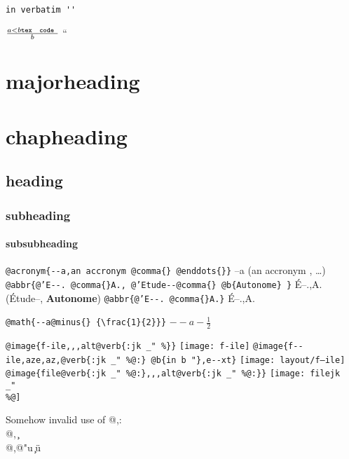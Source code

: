 \documentclass{book}
\newcommand{\GNUTexinfoplaceholder}[1]{}
\newcommand{\GNUTexinfonopagebreakheading}[2]{\let\clearpage\relax \let\cleardoublepage\relax \let\thispagestyle\GNUTexinfoplaceholder #1{#2}}
\renewcommand{\includegraphics}[1]{\fbox{FIG #1}}
\begin{document}
\begin{verbatim}
in verbatim ''
\end{verbatim}





$\frac{a < b \texttt{tex \hbox{ code }}}{b}$ ``

\GNUTexinfonopagebreakheading{\chapter*}{majorheading}

\GNUTexinfonopagebreakheading{\chapter*}{chapheading}

\GNUTexinfonopagebreakheading{\section*}{heading}

\GNUTexinfonopagebreakheading{\subsection*}{subheading}

\GNUTexinfonopagebreakheading{\subsubsection*}{subsubheading}


\texttt{@acronym\{{-}{-}a,an accronym @comma\{\} @enddots\{\}\}} --a (an accronym , \dots{})
\texttt{@abbr\{@'E{-}{-}. @comma\{\}A., @'Etude{-}{-}@comma\{\} @b\{Autonome\} \}} \'{E}--.\@ ,A.\@ (\'{E}tude--, \textbf{Autonome})
\texttt{@abbr\{@'E{-}{-}. @comma\{\}A.\}} \'{E}--.\@ ,A.\@

\texttt{@math\{{-}{-}a@minus\{\} \{\textbackslash{}frac\{1\}\{2\}\}\}} $--a- {\frac{1}{2}}$

\texttt{@image\{f-ile,,,alt@verb\{:jk \_" \%\@\}\}} \texttt{[image: f-ile]}
\texttt{@image\{f{-}{-}ile,aze,az,@verb\{:jk \_" \%@:\} @b\{in b "\},e{-}{-}xt\}} \texttt{[image: layout/f--ile]}
\texttt{@image\{file@verb\{:jk \_" \%@:\},,,alt@verb\{:jk \_" \%@:\}\}} \texttt{[image: filejk \\\_" \\\%@]}




Somehow invalid use of @,:\leavevmode{}\\
@, \c{}
\leavevmode{}\\
@,@"u \c{}\"{u}
\end{document}
